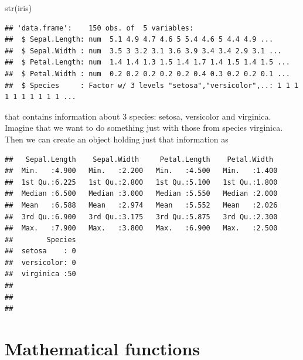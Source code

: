 \documentclass[
]{article}
\newenvironment{Shaded}{\begin{snugshade}}{\end{snugshade}}
\newcommand{\FloatTok}[1]{\textcolor[rgb]{0.00,0.00,0.81}{#1}}
\newcommand{\FunctionTok}[1]{\textcolor[rgb]{0.00,0.00,0.00}{#1}}
\newcommand{\NormalTok}[1]{#1}
\newcommand{\OtherTok}[1]{\textcolor[rgb]{0.56,0.35,0.01}{#1}}
\newcommand{\SpecialCharTok}[1]{\textcolor[rgb]{0.00,0.00,0.00}{#1}}
\newcommand{\StringTok}[1]{\textcolor[rgb]{0.31,0.60,0.02}{#1}}
\begin{document}
\begin{Shaded}
\begin{Highlighting}[]
\FunctionTok{str}\NormalTok{(iris)}
\end{Highlighting}
\end{Shaded}

\begin{verbatim}
## 'data.frame':    150 obs. of  5 variables:
##  $ Sepal.Length: num  5.1 4.9 4.7 4.6 5 5.4 4.6 5 4.4 4.9 ...
##  $ Sepal.Width : num  3.5 3 3.2 3.1 3.6 3.9 3.4 3.4 2.9 3.1 ...
##  $ Petal.Length: num  1.4 1.4 1.3 1.5 1.4 1.7 1.4 1.5 1.4 1.5 ...
##  $ Petal.Width : num  0.2 0.2 0.2 0.2 0.2 0.4 0.3 0.2 0.2 0.1 ...
##  $ Species     : Factor w/ 3 levels "setosa","versicolor",..: 1 1 1 1 1 1 1 1 1 1 ...
\end{verbatim}

that contains information about 3 species: setosa, versicolor and
virginica. Imagine that we want to do something just with those from
species virginica. Then we can create an object holding just that
information as

\begin{Shaded}
\end{Shaded}

\begin{verbatim}
##   Sepal.Length    Sepal.Width     Petal.Length    Petal.Width   
##  Min.   :4.900   Min.   :2.200   Min.   :4.500   Min.   :1.400  
##  1st Qu.:6.225   1st Qu.:2.800   1st Qu.:5.100   1st Qu.:1.800  
##  Median :6.500   Median :3.000   Median :5.550   Median :2.000  
##  Mean   :6.588   Mean   :2.974   Mean   :5.552   Mean   :2.026  
##  3rd Qu.:6.900   3rd Qu.:3.175   3rd Qu.:5.875   3rd Qu.:2.300  
##  Max.   :7.900   Max.   :3.800   Max.   :6.900   Max.   :2.500  
##        Species  
##  setosa    : 0  
##  versicolor: 0  
##  virginica :50  
##                 
##                 
## 
\end{verbatim}

\hypertarget{mathematical-functions}{%
\section{Mathematical functions}\label{mathematical-functions}}
\end{document}
